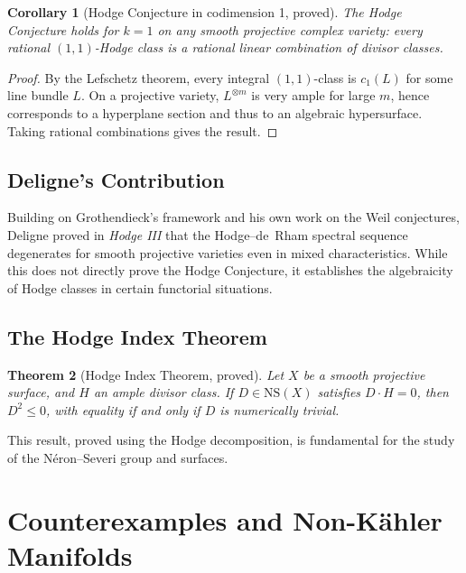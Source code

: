 \documentclass[12pt,a4paper]{amsart}
\newtheorem{theorem}{Theorem}[section]
\newtheorem{corollary}[theorem]{Corollary}
\theoremstyle{definition}
\theoremstyle{remark}
\begin{document}
\begin{corollary}[Hodge Conjecture in codimension 1, proved]
\label{cor:hc1}
The Hodge Conjecture holds for $k = 1$ on any smooth projective complex variety:
every rational $(1,1)$-Hodge class is a rational linear combination of divisor classes.
\end{corollary}

\begin{proof}
By the Lefschetz theorem, every integral $(1,1)$-class is $c_1(L)$ for some line
bundle $L$. On a projective variety, $L^{\otimes m}$ is very ample for large $m$,
hence corresponds to a hyperplane section and thus to an algebraic hypersurface.
Taking rational combinations gives the result.
\end{proof}

\subsection{Deligne's Contribution}

Building on Grothendieck's framework and his own work on the Weil conjectures,
Deligne proved in \emph{Hodge III} \cite{deligne1974} that the Hodge–de~Rham
spectral sequence degenerates for smooth projective varieties even in mixed
characteristics. While this does not directly prove the Hodge Conjecture, it
establishes the algebraicity of Hodge classes in certain functorial situations.

\subsection{The Hodge Index Theorem}

\begin{theorem}[Hodge Index Theorem, proved]
\label{thm:hodge-index}
Let $X$ be a smooth projective surface, and $H$ an ample divisor class. If
$D \in \mathrm{NS}(X)$ satisfies $D \cdot H = 0$, then $D^2 \le 0$, with equality
if and only if $D$ is numerically trivial.
\end{theorem}

This result, proved using the Hodge decomposition, is fundamental for the study
of the Néron–Severi group and surfaces.

\section{Counterexamples and Non-Kähler Manifolds}
\label{sec:counter}
\end{document}
